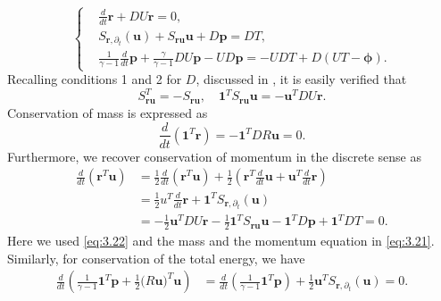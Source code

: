 \begin{equation} \label{eq:3.21}
\left\{
\begin{aligned}
	& \frac{d}{dt} \mathbf r + DU\mathbf r = 0, \\
	& S_{\mathbf r,\partial_t} (\mathbf u) + S_{\mathbf r \mathbf u} \mathbf u + D \mathbf p = D T, \\
	&\frac{1}{\gamma -1} \frac{d}{dt} \mathbf p + \frac{\gamma}{\gamma -1} D U \mathbf p - UD\mathbf p = - UDT + D(UT - \mathbf \phi).
\end{aligned}
\right.
\end{equation}
Recalling conditions 1 and 2 for $D$, discussed in , it is easily verified that
\begin{equation} \label{eq:3.22}
	S_{\mathbf r \mathbf u}^T = - S_{\mathbf r \mathbf u}, \quad \mathbf 1^T S_{\mathbf r \mathbf u} \mathbf u = - \mathbf u^T DU \mathbf r.
\end{equation}
Conservation of mass is expressed as
\begin{equation} \label{eq:3.23}
	\frac{d}{dt} (\mathbf 1^T \mathbf r) = - \mathbf 1^T DR\mathbf u = 0. 
\end{equation}
Furthermore, we recover conservation of momentum in the discrete sense as
\begin{equation} \label{eq:3.24}
\begin{aligned}
	\frac{d}{dt}(\mathbf r^T \mathbf u) &= \frac{1}{2} \frac{d}{dt}(\mathbf r^T \mathbf u) + \frac{1}{2} \left( \mathbf r^T \frac d{dt} \mathbf u +\mathbf u^T \frac{d}{dt} \mathbf r \right)\\
	&= \frac{1}{2}u^T \frac d{dt} \mathbf r + \mathbf 1^T S_{\mathbf r,\partial_t} (\mathbf u) \\
	&= -\frac 1 2 \mathbf u^T DU \mathbf r  - \frac 1 2 \mathbf 1^T S_{\mathbf r \mathbf u} \mathbf u - \mathbf 1^T D\mathbf p +  \mathbf 1^T D T = 0.
\end{aligned}
\end{equation}
Here we used \eqref{eq:3.22} and the mass and the momentum equation in \eqref{eq:3.21}. Similarly, for conservation of the total energy, we have
\begin{equation} \label{eq:3.25}
\begin{aligned}
	\frac{d}{dt} \left( \frac{1}{\gamma - 1} \mathbf 1^T \mathbf p + \frac 1 2 \mathbf (R\mathbf u)^T \mathbf u  \right) &= \frac{d}{dt} \left( \frac{1}{\gamma - 1} \mathbf 1^T \mathbf p \right) + \frac 1 2 \mathbf u^T  S_{\mathbf r,\partial_t} (\mathbf u) = 0.
\end{aligned}
\end{equation}
